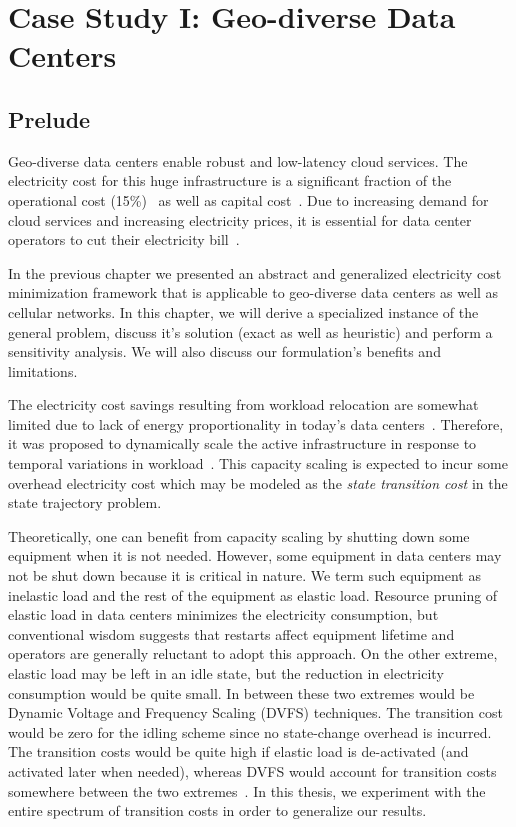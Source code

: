 \chapter{Case Study I: Geo-diverse Data Centers}
\label{chap:casestudy1}
\section{Prelude}
Geo-diverse data centers enable robust and low-latency cloud services. The electricity cost for this huge infrastructure is a significant fraction of the operational cost (15\%)~\cite{costCloud} as well as capital cost~\cite{qureshiHotnets}. Due to increasing demand for cloud services and increasing electricity prices, it is essential for data center operators to cut their electricity bill~\cite{brill:DataCenterCrisis:UI:2007,Belady_EC_2007}.

In the previous chapter we presented an abstract and generalized electricity cost minimization framework that is applicable to geo-diverse data centers as well as cellular networks. In this chapter, we will derive a specialized instance of the general problem, discuss it's solution (exact as well as heuristic) and perform a sensitivity analysis.  We will also discuss our formulation's benefits and limitations.

The electricity cost savings resulting from workload relocation are somewhat limited due to lack of energy proportionality in today's data centers~\cite{10.1109/MC.2007.443}. Therefore, it was proposed to dynamically scale the active infrastructure in response to temporal variations in workload~\cite{10.1109/MC.2007.443,qureshi2009cutting}. This capacity scaling is expected to incur some overhead electricity cost which may be modeled as the \textit{state transition cost} in the state trajectory problem. 

Theoretically, one can benefit from capacity scaling by shutting down some equipment when it is not needed. However, some equipment in data centers may not be shut down because it is critical in nature. We term such equipment as inelastic load and the rest of the equipment as elastic load. Resource pruning of elastic load in data centers minimizes the electricity consumption, but conventional wisdom suggests that restarts affect equipment lifetime and operators are generally reluctant to adopt this approach. On the other extreme, elastic load may be left in an idle state, but the reduction in electricity  consumption would be quite small. In between these two extremes would be Dynamic Voltage and Frequency Scaling (DVFS) techniques. The transition cost would be zero for the idling scheme since no state-change overhead is incurred. The transition costs would be quite high if elastic load is de-activated (and activated later when needed), whereas DVFS would account for transition costs somewhere between the two extremes~\cite{Meisner:2009:PES:1508244.1508269}. In this thesis, we experiment with the entire spectrum of transition costs in order to generalize our results.

